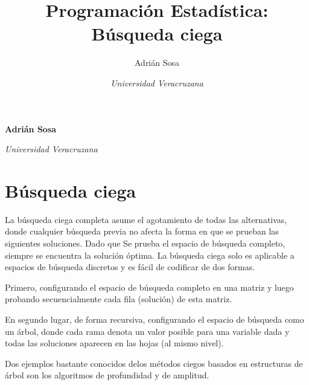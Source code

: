 \documentclass[11pt,]{article}
\title{Programación Estadística: Búsqueda ciega  }
\author{\Large Adrián Sosa\vspace{0.05in} \newline\normalsize\emph{}   \and \Large \vspace{0.05in} \newline\normalsize\emph{Universidad Veracruzana}  }
\date{}
\newcommand*{\authorfont}{\fontfamily{phv}\selectfont}
\begin{document}
	
%

{%
\setlength{\parindent}{0pt}
\thispagestyle{plain}
{\fontsize{18}{20}\selectfont\raggedright 
\maketitle  %

}

{
   \vskip 13.5pt\relax \normalsize\fontsize{11}{12} 
\textbf{\authorfont Adrián Sosa} \hskip 15pt \emph{\small }   \par \textbf{\authorfont } \hskip 15pt \emph{\small Universidad Veracruzana}   
}

}






\vskip -8.5pt



\noindent \doublespacing 

\hypertarget{buxfasqueda-ciega}{%
\section{Búsqueda ciega}\label{buxfasqueda-ciega}}

La búsqueda ciega completa asume el agotamiento de todas las
alternativas, donde cualquier búsqueda previa no afecta la forma en que
se prueban las siguientes soluciones. Dado que Se prueba el espacio de
búsqueda completo, siempre se encuentra la solución óptima. La búsqueda
ciega solo es aplicable a espacios de búsqueda discretos y es fácil de
codificar de dos formas.

Primero, configurando el espacio de búsqueda completo en una matriz y
luego probando secuencialmente cada fila (solución) de esta matriz.

En segundo lugar, de forma recursiva, configurando el espacio de
búsqueda como un árbol, donde cada rama denota un valor posible para una
variable dada y todas las soluciones aparecen en las hojas (al mismo
nivel).

Dos ejemplos bastante conocidos delos métodos ciegos basados en
estructuras de árbol son los algoritmos de profundidad y de amplitud.
\end{document}
